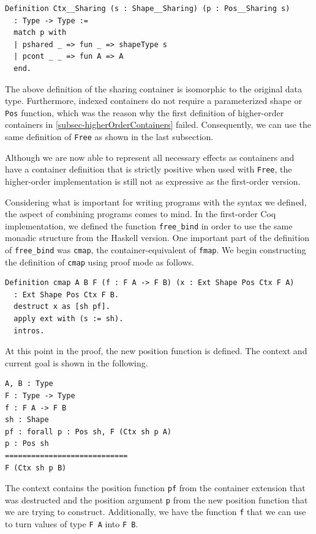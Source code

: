 \documentclass[a4paper, 11pt, fleqn, twoside, abstract=on]{scrreprt}
\newcommand{\cinl}[1]{\texttt{#1}}
\begin{document}
\begin{verbatim}
Definition Ctx__Sharing (s : Shape__Sharing) (p : Pos__Sharing s) 
  : Type -> Type :=
  match p with
  | pshared _ => fun _ => shapeType s
  | pcont _ _ => fun A => A
  end.
\end{verbatim}

The above definition of the sharing container is isomorphic to the original data type.
Furthermore, indexed containers do not require a parameterized shape or \cinl{Pos} function, which was the reason why the first definition of higher-order containers in \autoref{subsec-higherOrderContainers} failed.
Consequently, we can use the same definition of \cinl{Free} as shown in the last subsection.

Although we are now able to represent all necessary effects as containers and have a container definition that is strictly positive when used with \cinl{Free}, the higher-order implementation is still not as expressive as the first-order version.

Considering what is important for writing programs with the syntax we defined, the aspect of combining programs comes to mind.
In the first-order Coq implementation, we defined the function \cinl{free_bind} in order to use the same monadic structure from the Haskell version.
One important part of the definition of \cinl{free_bind} was \cinl{cmap}, the container-equivalent of \cinl{fmap}.
We begin constructing the definition of \cinl{cmap} using proof mode as follows.

\begin{verbatim}
Definition cmap A B F (f : F A -> F B) (x : Ext Shape Pos Ctx F A) 
  : Ext Shape Pos Ctx F B.
  destruct x as [sh pf].
  apply ext with (s := sh).
  intros.
\end{verbatim}
\noindent
At this point in the proof, the new position function is defined.
The context and current goal is shown in the following.

\begin{verbatim}
A, B : Type
F : Type -> Type
f : F A -> F B
sh : Shape
pf : forall p : Pos sh, F (Ctx sh p A)
p : Pos sh
============================
F (Ctx sh p B)
\end{verbatim}
\noindent
The context contains the position function \cinl{pf} from the container extension that was destructed and the position argument \cinl{p} from the new position function that we are trying to construct.
Additionally, we have the function \cinl{f} that we can use to turn values of type \cinl{F A} into \cinl{F B}.
\end{document}
